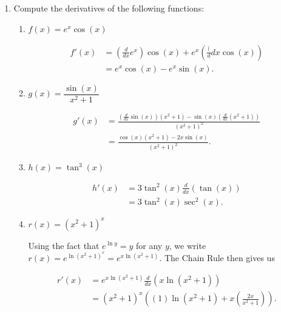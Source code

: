 \documentclass[12pt]{article}
\newcommand{\points}[1]{\marginpar{\hspace{24pt}[#1]}}
\begin{document}
\thispagestyle{fancy}

 \begin{enumerate}
 \item  Compute the derivatives of the following functions:
\begin{enumerate}
 \item $f(x) = e^x\cos(x)$ \points{2}

\bigskip

\begin{align*}
f'(x) &= \left(\frac{d}{dx}e^x\right)\cos(x)+e^x\left(\frac({d}{dx}\cos(x)\right)\\
& = e^x\cos(x)-e^x\sin(x).
\end{align*}

\bigskip


 \item $g(x) = \dfrac{\sin(x)}{x^2+1}$ \points{2}

\bigskip

\begin{align*}
 g'(x) &= \frac{\left(\frac{d}{dx}\sin(x)\right)(x^2+1)-\sin(x)\left(\frac{d}{dx}(x^2+1)\right)}{(x^2+1)^2}\\
 & = \frac{\cos(x)(x^2+1)-2x\sin(x)}{(x^2+1)^2}.
\end{align*}

\bigskip



 \item $h(x) = \tan^3(x)$ \points{2}

\bigskip

\begin{align*}
  h'(x) & = 3\tan^2(x)\frac{d}{dx}(\tan(x))\\
 & = 3\tan^2(x)\sec^2(x).
\end{align*}

\bigskip

 \item $r(x) = (x^2+1)^x$ \points{2}


\bigskip

Using the fact that $e^{\ln y} = y$ for any $y$, we write $r(x) = e^{\ln(x^2+1)^x} = e^{x\ln(x^2+1)}$. The Chain Rule then gives us

\begin{align*}
 r'(x) & = e^{x\ln(x^2+1)}\frac{d}{dx}(x\ln(x^2+1))\\
 & = (x^2+1)^x\left((1)\ln(x^2+1)+x\left(\frac{2x}{x^2+1}\right)\right).
\end{align*}


\end{enumerate}
\end{enumerate}
\end{document}
